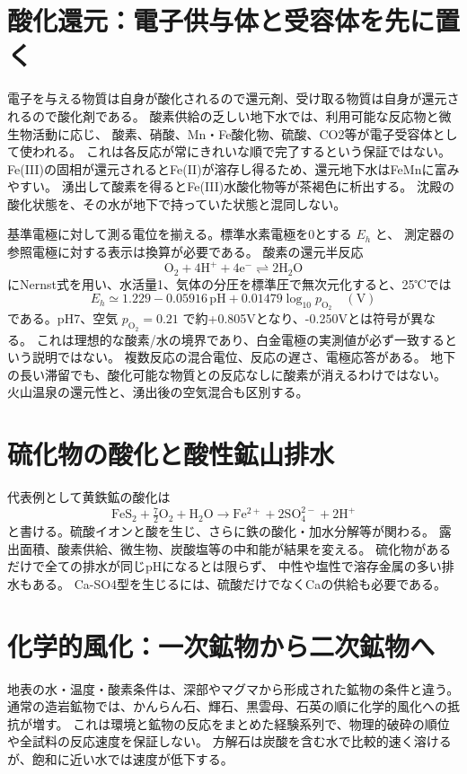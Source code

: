 \section{酸化還元：電子供与体と受容体を先に置く}
\label{theory:geochemistry:redox}
電子を与える物質は自身が酸化されるので還元剤、受け取る物質は自身が還元されるので酸化剤である。
酸素供給の乏しい地下水では、利用可能な反応物と微生物活動に応じ、
酸素、硝酸、Mn・Fe酸化物、硫酸、CO2等が電子受容体として使われる\cite{gc_redox,gc_redox2009}。
これは各反応が常にきれいな順で完了するという保証ではない。
Fe(III)の固相が還元されるとFe(II)が溶存し得るため、還元地下水はFeMnに富みやすい。
湧出して酸素を得るとFe(III)水酸化物等が茶褐色に析出する。
沈殿の酸化状態を、その水が地下で持っていた状態と混同しない。

基準電極に対して測る電位を揃える。標準水素電極を0とする \(E_h\) と、
測定器の参照電極に対する表示は換算が必要である。
酸素の還元半反応
\[
 \mathrm{O_2+4H^++4e^-\rightleftharpoons2H_2O}
\]
にNernst式を用い、水活量1、気体の分圧を標準圧で無次元化すると、25℃では
\[
 E_h\simeq1.229-0.05916\,\mathrm{pH}
       +0.01479\log_{10}p_{\mathrm{O_2}}\quad(\mathrm V)
\]
である。pH7、空気 \(p_{\mathrm{O_2}}=0.21\) で約+0.805Vとなり、-0.250Vとは符号が異なる。
これは理想的な酸素/水の境界であり、白金電極の実測値が必ず一致するという説明ではない。
複数反応の混合電位、反応の遅さ、電極応答がある\cite{gc_hem}。
地下の長い滞留でも、酸化可能な物質との反応なしに酸素が消えるわけではない。
火山温泉の還元性と、湧出後の空気混合も区別する。

\section{硫化物の酸化と酸性鉱山排水}
\label{theory:geochemistry:mine}
代表例として黄鉄鉱の酸化は
\[
 \mathrm{FeS_2+\tfrac72O_2+H_2O\longrightarrow Fe^{2+}+2SO_4^{2-}+2H^+}
\]
と書ける。硫酸イオンと酸を生じ、さらに鉄の酸化・加水分解等が関わる。
露出面積、酸素供給、微生物、炭酸塩等の中和能が結果を変える。
硫化物があるだけで全ての排水が同じpHになるとは限らず、
中性や塩性で溶存金属の多い排水もある\cite{gc_mine,gc_mine2015}。
Ca-SO4型を生じるには、硫酸だけでなくCaの供給も必要である。

\section{化学的風化：一次鉱物から二次鉱物へ}
\label{theory:geochemistry:weathering}
地表の水・温度・酸素条件は、深部やマグマから形成された鉱物の条件と違う。
通常の造岩鉱物では、かんらん石、輝石、黒雲母、石英の順に化学的風化への抵抗が増す。
これは環境と鉱物の反応をまとめた経験系列で、物理的破砕の順位や全試料の反応速度を保証しない。
方解石は炭酸を含む水で比較的速く溶けるが、飽和に近い水では速度が低下する。

